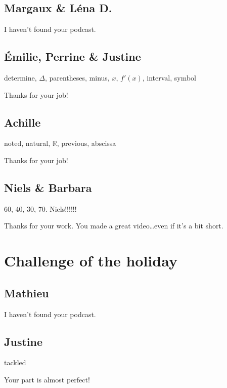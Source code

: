\documentclass[12pt,oneside]{report}
\begin{document}
\begin{spacing}{1.2}
\subsection*{Margaux \& Léna D.}

\color{blue}
I haven't found your podcast.
\color{black}

\subsection*{Émilie, Perrine \& Justine}

determine, $\Delta$, parentheses, minus, $x$, $f'(x)$, interval, symbol

\color{blue}
Thanks for your job!
\color{black}

\subsection*{Achille}

noted, natural, $\mathbb{R}$, previous, abscissa

\color{blue}
Thanks for your job!
\color{black}

\subsection*{Niels \& Barbara}

60, 40, 30, 70. Niels!!!!!!

\color{blue}
Thanks for your work. You made a great video\dots even if it's a bit short.
\color{black}




\section{Challenge of the holiday}

\subsection*{Mathieu}

\color{blue}
I haven't found your podcast.
\color{black}

\subsection*{Justine}

tackled

\color{blue}
Your part is almost perfect!


\end{spacing}
\end{document}
